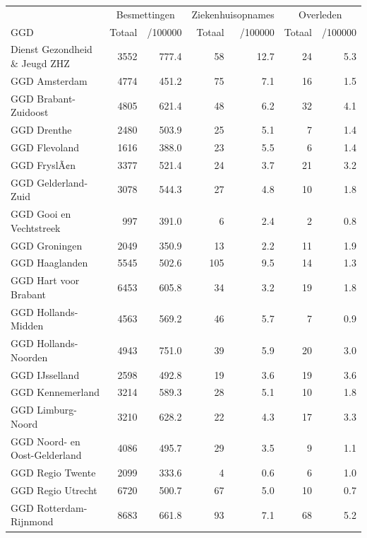 \documentclass[
  english,
  man,floatsintext]{apa6}
\begin{document}
\begin{table}
\centering\begingroup\fontsize{10}{12}\selectfont

\begin{threeparttable}
\begin{tabular}{lrrrrrr}
\toprule
\multicolumn{1}{c}{ } & \multicolumn{2}{c}{Besmettingen} & \multicolumn{2}{c}{Ziekenhuisopnames} & \multicolumn{2}{c}{Overleden} \\
\cmidrule(l{3pt}r{3pt}){2-3} \cmidrule(l{3pt}r{3pt}){4-5} \cmidrule(l{3pt}r{3pt}){6-7}
GGD & Totaal & /100000 & Totaal & /100000 & Totaal & /100000\\
\midrule
Dienst Gezondheid \& Jeugd ZHZ & 3552 & 777.4 & 58 & 12.7 & 24 & 5.3\\
GGD Amsterdam & 4774 & 451.2 & 75 & 7.1 & 16 & 1.5\\
GGD Brabant-Zuidoost & 4805 & 621.4 & 48 & 6.2 & 32 & 4.1\\
GGD Drenthe & 2480 & 503.9 & 25 & 5.1 & 7 & 1.4\\
GGD Flevoland & 1616 & 388.0 & 23 & 5.5 & 6 & 1.4\\
GGD FryslÃ¢n & 3377 & 521.4 & 24 & 3.7 & 21 & 3.2\\
GGD Gelderland-Zuid & 3078 & 544.3 & 27 & 4.8 & 10 & 1.8\\
GGD Gooi en Vechtstreek & 997 & 391.0 & 6 & 2.4 & 2 & 0.8\\
GGD Groningen & 2049 & 350.9 & 13 & 2.2 & 11 & 1.9\\
GGD Haaglanden & 5545 & 502.6 & 105 & 9.5 & 14 & 1.3\\
GGD Hart voor Brabant & 6453 & 605.8 & 34 & 3.2 & 19 & 1.8\\
GGD Hollands-Midden & 4563 & 569.2 & 46 & 5.7 & 7 & 0.9\\
GGD Hollands-Noorden & 4943 & 751.0 & 39 & 5.9 & 20 & 3.0\\
GGD IJsselland & 2598 & 492.8 & 19 & 3.6 & 19 & 3.6\\
GGD Kennemerland & 3214 & 589.3 & 28 & 5.1 & 10 & 1.8\\
GGD Limburg-Noord & 3210 & 628.2 & 22 & 4.3 & 17 & 3.3\\
GGD Noord- en Oost-Gelderland & 4086 & 495.7 & 29 & 3.5 & 9 & 1.1\\
GGD Regio Twente & 2099 & 333.6 & 4 & 0.6 & 6 & 1.0\\
GGD Regio Utrecht & 6720 & 500.7 & 67 & 5.0 & 10 & 0.7\\
GGD Rotterdam-Rijnmond & 8683 & 661.8 & 93 & 7.1 & 68 & 5.2\\

\end{tabular}
\end{threeparttable}
\end{table}
\end{document}
